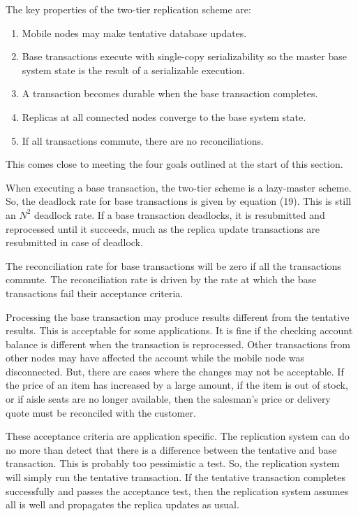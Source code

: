 \documentclass[a4paper,11pt,twoside,openright]{article}
\begin{document}
The key properties of the two-tier replication scheme are:

\begin{enumerate}
\def\labelenumi{\arabic{enumi}.}
\item
  Mobile nodes may make tentative database updates.
\item
  Base transactions execute with single-copy serializability so the
  master base system state is the result of a serializable execution.
\item
  A transaction becomes durable when the base transaction completes.
\item
  Replicas at all connected nodes converge to the base system state.
\item
  If all transactions commute, there are no reconciliations.
\end{enumerate}

This comes close to meeting the four goals outlined at the start of this
section.

When executing a base transaction, the two-tier scheme is a lazy-master
scheme. So, the deadlock rate for base transactions is given by equation
(19). This is still an \(N^2\) deadlock rate. If a
base transaction deadlocks, it is resubmitted and reprocessed until it
succeeds, much as the replica update transactions are resubmitted in
case of deadlock.

The reconciliation rate for base transactions will be zero if all the
transactions commute. The reconciliation rate is driven by the rate at
which the base transactions fail their acceptance criteria.

Processing the base transaction may produce results different from the
tentative results. This is acceptable for some applications. It is fine
if the checking account balance is different when the transaction is
reprocessed. Other transactions from other nodes may have affected the
account while the mobile node was disconnected. But, there are cases
where the changes may not be acceptable. If the price of an item has
increased by a large amount, if the item is out of stock, or if aisle
seats are no longer available, then the salesman's price or delivery
quote must be reconciled with the customer.

These acceptance criteria are application specific. The replication
system can do no more than detect that there is a difference between the
tentative and base transaction. This is probably too pessimistic a test.
So, the replication system will simply run the tentative transaction. If
the tentative transaction completes successfully and passes the
acceptance test, then the replication system assumes all is well and
propagates the replica updates as usual.
\end{document}
